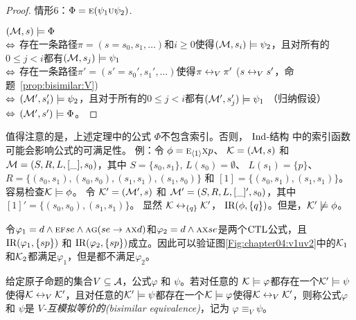 \begin{proof}
	情形6：$\Phi = \textsc{e} (\psi_1 \textsc{u} \psi_2)$.
	
	$({\cal M},s) \models \Phi$\\
	$\Leftrightarrow$ 存在一条路径$\pi=(s=s_0,s_1,\dots)$和$i \ge 0$使得$({\cal M},s_i) \models \psi_2$，且对所有的$0\leq j <i$都有$({\cal M},s_j)\models \psi_1$\\
	$\Leftrightarrow$ 存在一条路径$\pi'=(s'=s_0',s_1',\dots)$使得$\pi \leftrightarrow_V \pi'$ \hfill ($s \leftrightarrow_V s'$，命题~\ref{prop:bisimilar:V})\\
	$\Leftrightarrow$ $({\cal M}',s_i') \models \psi_2$，且对于所有的$0\leq j <i$都有$({\cal M}',s_j')\models \psi_1$  \hfill  （归纳假设）\\
	$\Leftrightarrow$ $({\cal M}',s')\models \Phi$。
\end{proof}

值得注意的是，上述定理中的公式 $\Phi$不包含索引。否则， $\textrm{Ind}$-结构 中的索引函数可能会影响公式的可满足性。
例：令 $\phi=\textsc{e}_{{\langle{1}\rangle}}\textsc{x} p$、
${\cal K}=({\cal M},s)$ 和 ${\cal M}=(S,R,L,[\_],s_0)$，其中 $S=\{s_0,s_1\}$, $L(s_0)=\emptyset$、 $L(s_1)=\{p\}$、
$R=\{(s_0,s_1),(s_0,s_0),(s_1,s_1), (s_1,s_0)\}$ 和 $[1]=\{(s_0,s_1), (s_1,s_1)\}$。容易检查${\cal K}\models\phi$。
令 ${\cal K}'=({\cal M}',s)$ 和 ${\cal M}'=(S,R,L,[\_]',s_0)$，其中 $[1]'=\{(s_0,s_0),(s_1,s_1)\}$。
显然 ${\cal K}\leftrightarrow_{\{q\}}{\cal K}'$， $\textrm{IR}(\phi,\{q\})$。但是，${\cal K}'\not\models\phi$。

\begin{example}
	令$\varphi_1 = d \wedge \textsc{e}\textsc{f} se \wedge \textsc{a}\textsc{g}(se \rightarrow \textsc{a}\textsc{x} d)$和$\varphi_2=d \wedge \textsc{a}\textsc{x} se$是两个$\textrm{CTL}$公式，且$\textrm{IR}(\varphi_1,\{sp\})$ 和 $\textrm{IR}(\varphi_2,\{sp\})$成立。因此可以验证图\ref{Fig:chapter04:v1uv2}中的${\cal K}_1$和${\cal K}_2$都满足$\varphi_1$，但是都不满足$\varphi_2$。
\end{example}

\begin{definition}\label{def:bisimular:equivalene}
	给定原子命题的集合$V\subseteq {\cal A}$，公式$\varphi$ 和 $\psi$。若对任意的 ${\cal K}\models \varphi$都存在一个${\cal K}'\models\psi$使得${\cal K}\leftrightarrow_V{\cal K}'$，且对任意的${\cal K}'\models\psi$都存在一个${\cal K}\models \varphi$使得${\cal K}\leftrightarrow_V{\cal K}'$，则称公式$\varphi$和 $\psi$是 {\em $V$-互模拟等价的(bisimilar equivalence)}，记为 $\varphi\equiv_V\psi$。
\end{definition}

